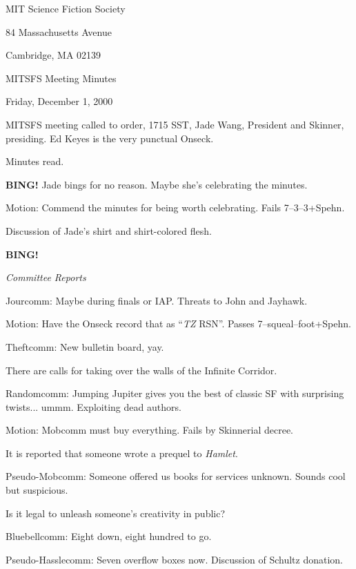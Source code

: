 \documentclass[12pt]{article}
\newcommand{\bing}{{\bf BING!} }
\newcommand{\goto}[1]{\bing \vskip 12pt \centerline{{\em{#1}}}}
\begin{document}
\begin{center}

MIT Science Fiction Society 

84 Massachusetts Avenue

Cambridge, MA 02139

\vspace{12pt}

MITSFS Meeting Minutes 

Friday, December 1, 2000

\end{center}
 
\vspace{18pt}

\setlength{\parskip}{6pt}

\noindent
MITSFS meeting called to order, 1715 SST, Jade Wang, President and
Skinner, presiding.  Ed Keyes is the very punctual Onseck.

Minutes read.

\bing Jade bings for no reason.  Maybe she's celebrating the minutes.

Motion: Commend the minutes for being worth celebrating.  Fails
7--3--3+Spehn.

Discussion of Jade's shirt and shirt-colored flesh.

\goto{Committee Reports}

Jourcomm: Maybe during finals or IAP.  Threats to John and Jayhawk.

Motion: Have the Onseck record that as ``{\em TZ} RSN''.  Passes
7--squeal--foot+Spehn.

Theftcomm: New bulletin board, yay.

There are calls for taking over the walls of the Infinite Corridor.

Randomcomm: Jumping Jupiter gives you the best of classic SF with
surprising twists... ummm.  Exploiting dead authors.

Motion: Mobcomm must buy everything.  Fails by Skinnerial decree.

It is reported that someone wrote a prequel to {\em Hamlet}.

Pseudo-Mobcomm: Someone offered us books for services unknown.  Sounds
cool but suspicious.

Is it legal to unleash someone's creativity in public?

Bluebellcomm: Eight down, eight hundred to go.

Pseudo-Hasslecomm: Seven overflow boxes now.  Discussion of Schultz
donation.
\end{document}
